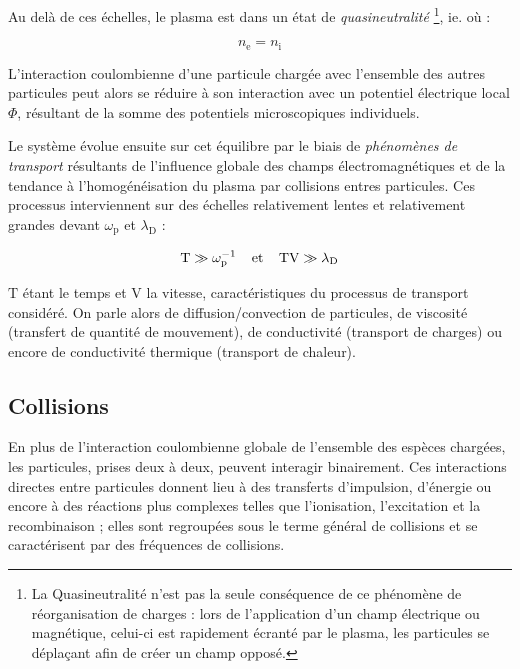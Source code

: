 \begin{refsection}
Au delà de ces échelles, le plasma est dans un état de \emph{quasineutralité}
\footnote{La Quasineutralité n'est pas la seule conséquence de ce phénomène de réorganisation
de charges : lors de l'application d'un champ électrique ou magnétique, celui-ci est rapidement
écranté par le plasma, les particules se
déplaçant afin de créer un champ opposé.}, 
ie. où :

\begin{equation}
n_\text{e}=n_\text{i}
\label{quasineutralité}
\end{equation}

L'interaction coulombienne d'une particule chargée avec l'ensemble des autres particules peut alors
se réduire à son interaction avec un potentiel électrique local $\Phi$,
résultant de la somme des potentiels microscopiques individuels.

Le système évolue ensuite sur cet équilibre par le biais de
\emph{phénomènes de transport} résultants de l'influence
globale des champs électromagnétiques et de la tendance à
l'homogénéisation du plasma par collisions entres particules.
Ces processus interviennent sur des échelles relativement
lentes et relativement grandes devant $\omega_\text{p}$ et $\lambda_\text{D}$ :

\begin{equation}
\text{T}\gg \omega_\text{p}^{{-1}}
\;\;\;\;\text{et}\;\;\;\;\text{TV}\gg\lambda_\text{D}
\end{equation}

$\text{T}$ étant le temps et $\text{V} $ la vitesse, caractéristiques du
processus de transport considéré.
On parle alors de diffusion/convection de particules, de viscosité (transfert de
quantité de mouvement), de conductivité (transport de charges) ou encore de
conductivité thermique (transport de chaleur).

\subsection{Collisions}
En plus de l'interaction coulombienne globale de l'ensemble des espèces chargées, 
les particules, prises deux à deux, peuvent interagir binairement. 
Ces interactions directes entre particules donnent lieu à des transferts
d'impulsion, d'énergie ou encore à des réactions plus complexes telles que
l'ionisation, l'excitation et la recombinaison ; elles sont regroupées
sous le terme général de collisions et se caractérisent par des fréquences de
collisions.


\end{refsection}
